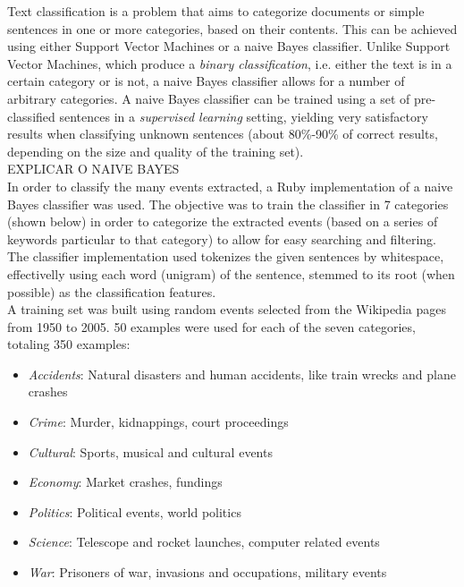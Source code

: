 \documentclass{llncs}
\begin{document}
Text classification is a problem that aims to categorize documents or simple sentences in one or more categories, based on their contents. This can be achieved using either Support Vector Machines or a naive Bayes classifier. Unlike Support Vector Machines, which produce a \textit{binary classification}, i.e. either the text is in a certain category or is not, a naive Bayes classifier allows for a number of arbitrary categories. A naive Bayes classifier can be trained using a set of pre-classified sentences in a \textit{supervised learning} setting, yielding very satisfactory results when classifying unknown sentences (about 80\%-90\% of correct results, depending on the size and quality of the training set).\cite{russel}\\

EXPLICAR O NAIVE BAYES\\

In order to classify the many events extracted, a Ruby implementation of a naive Bayes classifier\cite{classifier} was used. The objective was to train the classifier in 7 categories (shown below) in order to categorize the extracted events (based on a series of keywords particular to that category) to allow for easy searching and filtering. The classifier implementation used tokenizes the given sentences by whitespace, effectivelly using each word (unigram) of the sentence, stemmed to its root (when possible) as the classification features.\\

A training set was built using random events selected from the Wikipedia pages from 1950 to 2005. 50 examples were used for each of the seven categories, totaling 350 examples:

\begin{itemize}
	\item \textit{Accidents}: Natural disasters and human accidents, like train wrecks and plane crashes
	\item \textit{Crime}: Murder, kidnappings, court proceedings
	\item \textit{Cultural}: Sports, musical and cultural events
	\item \textit{Economy}: Market crashes, fundings
	\item \textit{Politics}: Political events, world politics
	\item \textit{Science}: Telescope and rocket launches, computer related events
	\item \textit{War}: Prisoners of war, invasions and occupations, military events
\end{itemize}
\end{document}
